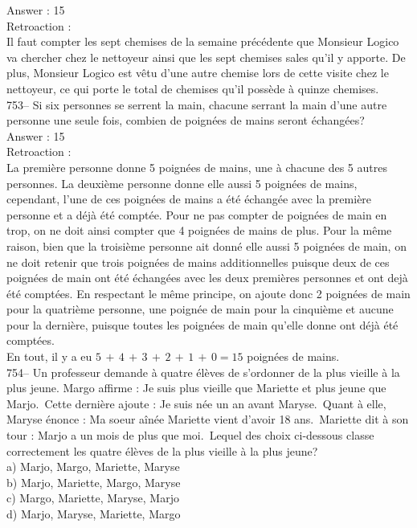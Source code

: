 ﻿\documentclass[letterpaper, 12pt]{article}
\begin{document}
Answer : 15\\

Retroaction : \\
Il faut compter les sept chemises de la semaine pr\'ec\'edente que Monsieur
Logico va chercher chez le nettoyeur ainsi que les sept chemises sales qu'il
y apporte. De plus, Monsieur Logico est v\^etu d'une autre chemise lors de
cette visite chez le nettoyeur, ce qui porte le total de chemises qu'il
poss\`ede \`a quinze chemises.\\

753-- Si six personnes se serrent la main, chacune serrant la main d'une
autre personne une seule fois, combien de poign\'ees de mains seront
\'echang\'ees?\\

Answer : 15\\

Retroaction : \\
La premi\`ere personne donne 5 poign\'ees de mains, une \`a chacune
des 5 autres personnes. La deuxi\`eme personne donne elle aussi 5
poign\'ees de mains, cependant, l'une de ces poign\'ees de mains a
\'et\'e \'echang\'ee avec la premi\`ere personne et a d\'ej\`a
\'et\'e compt\'ee. Pour ne pas compter de poign\'ees de main en
trop, on ne doit ainsi compter que 4 poign\'ees de mains de plus.
Pour la m\^eme raison, bien que la troisi\`eme personne ait donn\'e
elle aussi 5 poign\'ees de main, on ne doit retenir que trois
poign\'ees de mains additionnelles puisque deux de ces poign\'ees de
main ont \'et\'e \'echang\'ees avec les deux premi\`eres personnes
et ont dej\`a \'et\'e compt\'ees. En respectant le m\^eme principe,
on ajoute donc 2 poign\'ees de main pour la quatri\`eme personne,
une poign\'ee de main pour la cinqui\`eme et aucune pour la
derni\`ere, puisque toutes les poign\'ees de main qu'elle donne ont
d\'ej\`a
\'et\'e compt\'ees.\\
En tout, il y a eu $5\,+\,4\,+\,3\,+\,2\,+\,1\,+\,0=15$ poign\'ees de
mains.\\

754-- Un professeur demande \`a quatre \'el\`eves de s'ordonner de
la plus vieille \`a la plus jeune.  Margo affirme : \og Je suis plus
vieille que Mariette et plus jeune que Marjo.\fg\  Cette derni\`ere
ajoute : \og Je suis n\'ee un an avant Maryse.\fg\  Quant \`a elle,
Maryse \'enonce : \og Ma soeur a\^in\'ee Mariette vient d'avoir 18
ans.\fg\ Mariette dit \`a son tour : \og Marjo a un mois de plus que
moi.\fg\ Lequel des choix ci-dessous classe correctement les
quatre \'el\`eves de la plus vieille \`a la plus jeune?\\
a) Marjo, Margo, Mariette, Maryse\\
b) Marjo, Mariette, Margo, Maryse\\
c) Margo, Mariette, Maryse, Marjo\\
d) Marjo, Maryse, Mariette, Margo\\
\end{document}
